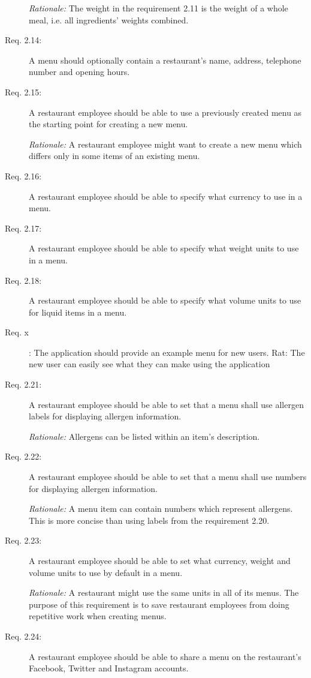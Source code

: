\begin{description}
    \emph{Rationale:} The weight in the requirement 2.11 is the weight of a whole meal, i.e. all ingredients' weights combined.
    \item [Req. 2.14:] A menu should optionally contain a restaurant's name, address, telephone number and opening hours.
    \item [Req. 2.15:] A restaurant employee should be able to use a previously created menu as the starting point for creating a new menu.

    \emph{Rationale:} A restaurant employee might want to create a new menu which differs only in some items of an existing menu.
    \item [Req. 2.16:] A restaurant employee should be able to specify what currency to use in a menu.
    \item [Req. 2.17:] A restaurant employee should be able to specify what weight units to use in a menu.
    \item [Req. 2.18:] A restaurant employee should be able to specify what volume units to use for liquid items in a menu.
    \item [Req. x]: The application should provide an example menu for new users.
    Rat: The new user can easily see what they can make using the application
    \item [Req. 2.21:] A restaurant employee should be able to set that a menu shall use allergen labels for displaying allergen information.

    \emph{Rationale:} Allergens can be listed within an item's description.
    \item [Req. 2.22:] A restaurant employee should be able to set that a menu shall use numbers for displaying allergen information.

    \emph{Rationale:} A menu item can contain numbers which represent allergens. This is more concise than using labels from the requirement 2.20.
    \item [Req. 2.23:] A restaurant employee should be able to set what currency, weight and volume units to use by default in a menu.
  
    \emph{Rationale:} A restaurant might use the same units in all of its menus. The purpose of this requirement is to save restaurant employees from doing repetitive work when creating menus.
    \item [Req. 2.24:] A restaurant employee should be able to share a menu on the restaurant's Facebook, Twitter and Instagram accounts.
  \end{description}

